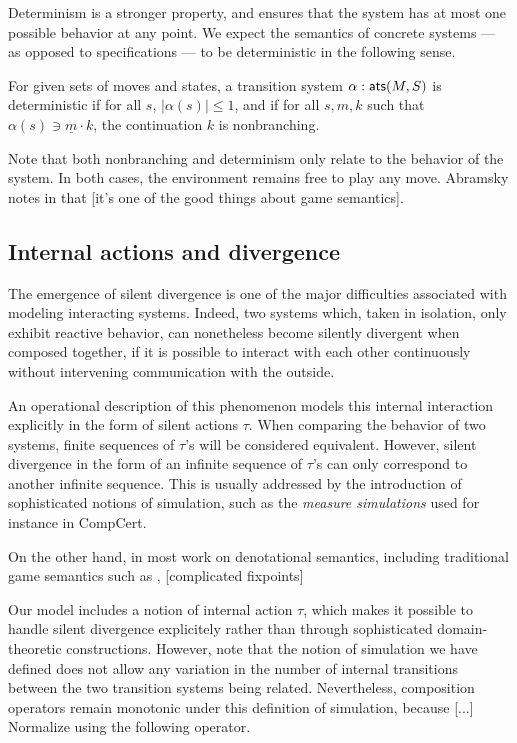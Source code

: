 Determinism is a stronger property,
and ensures that the system has at most one possible behavior
at any point.
We expect the semantics of concrete systems ---
as opposed to specifications ---
to be deterministic in the following sense.

\begin{definition}
For given sets of moves and states,
a transition system $\alpha :  \mathsf{ats} (M, S)$
is deterministic if for all $s$, $|\alpha(s)| \le 1$,
and if for all $s, m, k$ such that $\alpha(s) \ni \underline{m} \cdot k$,
the continuation $k$ is nonbranching.
\end{definition}

Note that both nonbranching and determinism
only relate to the behavior of the system.
In both cases,
the environment remains free to play any move.
Abramsky notes in \cite{cspgs}
that [it's one of the good things about game semantics].

\subsection{Internal actions and divergence}

The emergence of silent divergence
is one of the major difficulties
associated with modeling interacting systems.
Indeed,
two systems which, taken in isolation,
only exhibit reactive behavior,
can nonetheless become silently divergent when composed together,
if it is possible to interact with each other continuously
without intervening communication with the outside.

An operational description of this phenomenon
models this internal interaction explicitly
in the form of silent actions $\tau$.
When comparing the behavior of two systems,
finite sequences of $\tau$'s will be considered equivalent.
However,
silent divergence in the form of an infinite sequence of $\tau$'s
can only correspond to another infinite sequence.
This is usually addressed by the introduction of
sophisticated notions of simulation,
such as the \emph{measure simulations} used for instance in CompCert.

On the other hand,
in most work on denotational semantics,
including traditional game semantics such as \cite{pcfgs},
[complicated fixpoints] 

Our model includes a notion of internal action $\tau$,
which makes it possible to handle silent divergence explicitely
rather than through sophisticated domain-theoretic constructions.
However,
note that the notion of simulation we have defined
does not allow any variation
in the number of internal transitions
between the two transition systems being related.
Nevertheless,
composition operators remain monotonic
under this definition of simulation,
because [...]
Normalize using the following operator.


